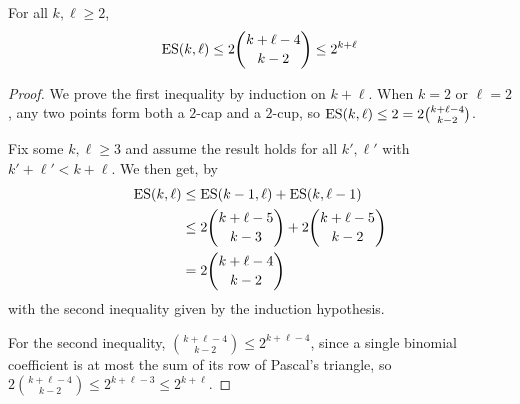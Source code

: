 \begin{boxcorollary}
    For all $k, \ell \geq 2$,
    \begin{align*}
        \operatorname{ES}(k, \ell) \leq 2\binom{k + \ell - 4}{k - 2} \leq 2^{k + \ell}
    \end{align*}
\end{boxcorollary}
\begin{proof}
    We prove the first inequality by induction on $k + \ell$. When $k = 2$ or $\ell = 2$, any two points form both a $2$-cap and a $2$-cup, so $\operatorname{ES}(k, \ell) \leq 2 = 2\binom{k + \ell - 4}{k - 2}$.

    Fix some $k, \ell \geq 3$ and assume the result holds for all $k', \ell'$ with $k' + \ell' < k + \ell$. We then get, by 
    \begin{align*}
        \operatorname{ES}(k, \ell)
        &\leq \operatorname{ES}(k - 1, \ell) + \operatorname{ES}(k, \ell - 1) \\
        &\leq 2\binom{k + \ell - 5}{k - 3} + 2\binom{k + \ell - 5}{k - 2} \\
        &= 2\binom{k + \ell - 4}{k - 2}
    \end{align*}
    with the second inequality given by the induction hypothesis.
    
    For the second inequality, $\binom{k + \ell - 4}{k - 2} \leq 2^{k + \ell - 4}$, since a single binomial coefficient is at most the sum of its row of Pascal's triangle, so $2\binom{k + \ell - 4}{k - 2} \leq 2^{k + \ell - 3} \leq 2^{k + \ell}$.
\end{proof}
